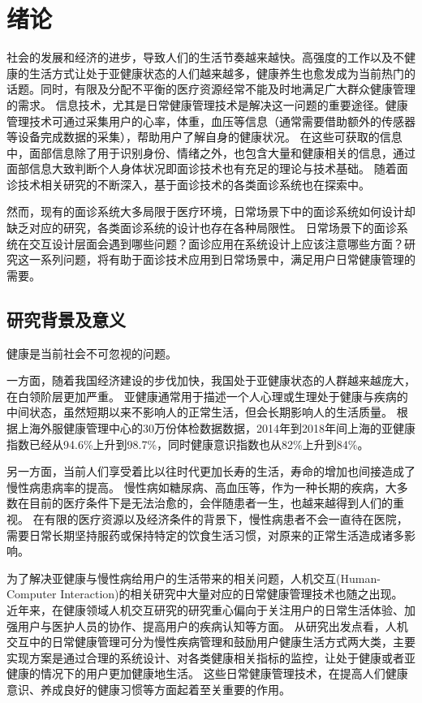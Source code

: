 \chapter{绪论}

社会的发展和经济的进步，导致人们的生活节奏越来越快。高强度的工作以及不健康的生活方式让处于亚健康状态的人们越来越多，健康养生也愈发成为当前热门的话题。同时，有限及分配不平衡的医疗资源经常不能及时地满足广大群众健康管理的需求\cite{雷鹏2019中国医疗资源配置与服务利用现状评价}。
信息技术，尤其是日常健康管理技术是解决这一问题的重要途径。健康管理技术可通过采集用户的心率，体重，血压等信息（通常需要借助额外的传感器等设备完成数据的采集），帮助用户了解自身的健康状况。
在这些可获取的信息中，面部信息除了用于识别身份、情绪之外，也包含大量和健康相关的信息，通过面部信息大致判断个人身体状况即面诊技术也有充足的理论与技术基础\cite{li2020tcminet}。
随着面诊技术相关研究的不断深入，基于面诊技术的各类面诊系统也在探索中\cite{林锋2019中医面诊系统调研报告}。

然而，现有的面诊系统大多局限于医疗环境，日常场景下中的面诊系统如何设计却缺乏对应的研究，各类面诊系统的设计也存在各种局限性。
日常场景下的面诊系统在交互设计层面会遇到哪些问题？面诊应用在系统设计上应该注意哪些方面？研究这一系列问题，将有助于面诊技术应用到日常场景中，满足用户日常健康管理的需要。

\section{研究背景及意义}
健康是当前社会不可忽视的问题。

一方面，随着我国经济建设的步伐加快，我国处于亚健康状态的人群越来越庞大，在白领阶层更加严重。
亚健康通常用于描述一个人心理或生理处于健康与疾病的中间状态，虽然短期以来不影响人的正常生活，但会长期影响人的生活质量。
根据上海外服健康管理中心的30万份体检数据数据，2014年到2018年间上海的亚健康指数已经从94.6\%上升到98.7\%，同时健康意识指数也从82\%上升到84\%\cite{health_report2019}。

另一方面，当前人们享受着比以往时代更加长寿的生活，寿命的增加也间接造成了慢性病患病率的提高\cite{OlshanskyDEMOGRAPHY}。
慢性病如糖尿病、高血压等，作为一种长期的疾病，大多数在目前的医疗条件下是无法治愈的，会伴随患者一生，也越来越得到人们的重视\cite{blandford2019hci, Ben2002A}。
在有限的医疗资源以及经济条件的背景下，慢性病患者不会一直待在医院，需要日常长期坚持服药或保持特定的饮食生活习惯，对原来的正常生活造成诸多影响\cite{lupton2017self-tracking}。

为了解决亚健康与慢性病给用户的生活带来的相关问题，人机交互(Human-Computer Interaction)的相关研究中大量对应的日常健康管理技术也随之出现。
近年来，在健康领域人机交互研究的研究重心偏向于关注用户的日常生活体验、加强用户与医护人员的协作、提高用户的疾病认知等方面。
从研究出发点看，人机交互中的日常健康管理可分为慢性疾病管理和鼓励用户健康生活方式两大类，主要实现方案是通过合理的系统设计、对各类健康相关指标的监控，让处于健康或者亚健康的情况下的用户更加健康地生活。
这些日常健康管理技术，在提高人们健康意识、养成良好的健康习惯等方面起着至关重要的作用\cite{ayobi2017quantifying}。

